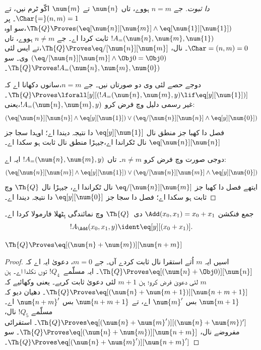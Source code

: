 \documentclass[../../../include/open-logic-section]{subfiles}
\begin{document}
\begin{proof}[ دا ثبوت]
جے $n = m$ ہووے، تاں $\num{n}$ تے $\num{m}$ اکّو ٹرم نیں،
تے $\Char{=}(n, m) = 1$۔ پر
$\Th{Q} \Proves (\eq[\num{n}][\num{m}] \land
\eq[\num{1}][\num{1}])$،سو اوہ
$!A_=(\num{n}, \num{m},
\num{1})$ ثابت کردا اے۔ جے $n \neq m$ ہووے، تاں
$\Char=(n, m) = 0$۔  نال،
$\Th{Q} \Proves \eq/[\num{n}][\num{m}]$،تے ایس لئی
$(\eq/[\num{n}][\num{m}] \land \Obj 0 = \Obj 0)$ وی۔
سو $\Th{Q}
\Proves !A_=(\num{n}, \num{m}, \num{0})$۔

دوجے حصے لئی وی دو صورتاں نیں۔ جے $n = m$،سانوں
دکھانا اے کہ $\Th{Q} \Proves \lforall[y][(!A_=(\num{n}, \num{m}, y)
  \lif \eq[y][\num{1}])]$۔ غیر رسمی دلیل وچ فرض کرو
$!A_=(\num{n},
\num{m}, y)$،یعنی:
\[
(\eq[\num{n}][\num{n}] \land \eq[y][\num{1}]) \lor
(\eq/[\num{n}][\num{n}] \land \eq[y][\num{0}])
\]
فصل دا کھبا جز منطق نال $\eq[y][\num{1}]$ دا نتیجہ دیندا اے؛
اوہدا سجا جز $\eq[\num{n}][\num{n}]$ نال ٹکراندا اے،جیہڑا
منطق نال ثابت ہو سکدا اے۔

دوجی صورت وچ فرض کرو $n \neq m$۔ تاں
$!A_=(\num{n},
\num{m}, y)$ ایہ اے:
\[
(\eq[\num{n}][\num{m}] \land \eq[y][\num{1}]) \lor
(\eq/[\num{n}][\num{m}] \land \eq[y][\num{0}])
\]
ایتھے فصل دا کھبا جز $\eq/[\num{n}][\num{m}]$ نال ٹکراندا اے،
جیہڑا  نال $\Th{Q}$ وچ ثابت ہو سکدا اے؛
فصل دا سجا جز $\eq[y][\num{0}]$ دا نتیجہ دیندا اے۔
\end{proof}

\begin{prop}
جمع فنکشن $\Add(x_0, x_1) = x_0+x_1$ دی~$\Th{Q}$ وچ نمائندگی ہِٹھلا فارمولا کردا اے۔
\[
  !A_{\Add}(x_0, x_1, y) \ident \eq[y][(x_0 + x_1)].
\]
\end{prop}

\begin{lem}
$\Th{Q} \Proves \eq[(\num{n} + \num{m})][\num{n+m}]$
\end{lem}

\begin{proof}
اسیں ایہ $m$ اُتے استقرا نال ثابت کردے آں۔ جے $m = 0$،
دعویٰ ایہ اے کہ
$\Th{Q} \Proves \eq[(\num{n} + \Obj 0)][\num{n}]$۔ ایہ
مسلّمے~$!Q_4$ توں نکلدا اے۔ ہن $m$ لئی دعویٰ فرض کرو؛
ہن $m+1$ لئی دعویٰ ثابت کریے۔ یعنی وکھائیے کہ
$\Th{Q} \Proves \eq[(\num{n} +
  \num{m+1})][\num{n+m+1}]$۔ دھیان دیو کہ $\num{m+1}$
بس $\num{m}'$ اے، تے $\num{n+m+1}$ بس $\num{n+m}'$ اے۔
مسلّمے $!Q_5$ نال،$\Th{Q}
\Proves \eq[(\num{n} + \num{m}')][(\num{n}+\num{m})']$۔
استقرائی مفروضے نال،
$\Th{Q} \Proves \eq[(\num{n} + \num{m})][\num{n+m}]$۔ سو
$\Th{Q} \Proves \eq[(\num{n} + \num{m}')][\num{n+m}']$۔
\end{proof}
\end{document}
